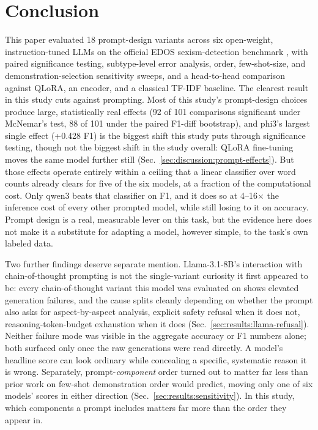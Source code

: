 \section{Conclusion}
\label{sec:conclusion}

This paper evaluated 18 prompt-design variants across six open-weight,
instruction-tuned LLMs on the official EDOS sexism-detection benchmark
\cite{kirk2023semeval}, with paired significance testing, subtype-level
error analysis, order, few-shot-size, and demonstration-selection
sensitivity sweeps, and a head-to-head comparison against QLoRA, an
encoder, and a classical TF-IDF baseline. The clearest result in this
study cuts against prompting. Most of this study's prompt-design choices produce
large, statistically real effects (92 of 101 comparisons significant
under McNemar's test, 88 of 101 under the paired F1-diff bootstrap), and
phi3's largest single effect (+0.428 F1) is the biggest shift this study
puts through significance testing, though not the biggest shift in the
study overall: QLoRA fine-tuning moves the same model further still
(Sec.~\ref{sec:discussion:prompt-effects}). But
those effects operate entirely within a ceiling that a linear classifier
over word counts already clears for five of the six models, at a
fraction of the computational cost. Only qwen3 beats that classifier on
F1, and it does so at 4--16$\times$ the inference cost of every other
prompted model, while still losing to it on accuracy. Prompt design is a
real, measurable lever on this task, but the evidence here does not make
it a substitute for adapting a model, however simple, to the task's own
labeled data.

Two further findings deserve separate mention. Llama-3.1-8B's
interaction with chain-of-thought prompting is not the single-variant
curiosity it first appeared to be: every chain-of-thought variant this
model was evaluated on shows elevated generation failures, and the cause
splits cleanly depending on whether the prompt also asks for
aspect-by-aspect analysis, explicit safety refusal when it does not,
reasoning-token-budget exhaustion when it does
(Sec.~\ref{sec:results:llama-refusal}). Neither failure mode was visible
in the aggregate accuracy or F1 numbers alone; both surfaced only once
the raw generations were read directly. A model's headline score can
look ordinary while concealing a specific, systematic reason it is
wrong. Separately, prompt-\emph{component} order turned out to matter
far less than prior work on few-shot demonstration order would predict,
moving only one of six models' scores in either direction
(Sec.~\ref{sec:results:sensitivity}). In this study, which components a
prompt includes matters far more than the order they appear in.

